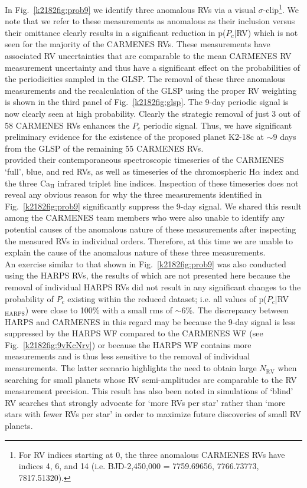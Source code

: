 In Fig.~\ref{k2182fig:prob9}
we identify three anomalous RVs via a visual $\sigma$-clip\footnote{For RV indices starting at 0, the three anomalous
  CARMENES RVs have indices 4, 6, and 14 (i.e. BJD-2,450,000 = 7759.69656, 7766.73773, 7817.51320).}.
We note that we refer to these measurements as anomalous as their inclusion
versus their omittance clearly results in a significant reduction in p($P_c|$RV) which is not seen for the majority of
the CARMENES RVs. These measurements have associated RV uncertainties that are
comparable to the mean CARMENES RV measurement uncertainty and thus have a significant effect on the probabilities
of the periodicities sampled in the GLSP. The removal of these three anomalous measurements and the
recalculation of the GLSP using the proper RV weighting is shown in the third panel of Fig.~\ref{k2182fig:glsp}.
The 9-day periodic signal is now clearly seen at high probability. Clearly the strategic removal of just
3 out of 58 CARMENES RVs enhances the $P_c$ periodic signal. Thus, we have significant preliminary evidence for the
existence of the proposed planet K2-18c at $\sim 9$ days from the GLSP of the remaining 55 CARMENES RVs. \\

 provided their contemporaneous spectroscopic timeseries of the CARMENES `full', 
blue, and red RVs, as well as timeseries of the chromospheric  H$\alpha$ index and the three Ca$_{\text{II}}$ infrared
triplet line indices. Inspection of these timeseries does not reveal any obvious reason for why the three
measurements identified in Fig.~\ref{k2182fig:prob9} significantly suppress the 9-day signal.
We shared this result among the CARMENES team
members who were also unable to identify any potential causes of the anomalous nature of these measurements
after inspecting the measured RVs in individual orders. Therefore, at this time we are unable to explain
the cause of the anomalous nature of these three measurements. \\

An exercise similar to that  shown in Fig.~\ref{k2182fig:prob9} was also conducted using the HARPS RVs,  the results of which
are not presented here because the removal of individual HARPS RVs did not result
in any significant changes to the probability of $P_c$ existing within the reduced dataset; i.e. all values of
p($P_c$|RV$_{\text{HARPS}}$) were close to 100\% with a small rms of $\sim 6$\%.
The discrepancy between HARPS and CARMENES in this regard may be because the 9-day signal
is less suppressed by the HARPS WF compared to the CARMENES WF (see Fig.~\ref{k2182fig:9vKcNrv}) or because the HARPS
WF contains more measurements and is thus less sensitive to the removal of individual measurements. The latter
scenario highlights the need to obtain large $N_{\text{RV}}$ when searching for small planets whose RV
semi-amplitudes are comparable to the RV measurement precision. This result has also been noted in simulations of
`blind' RV searches \citep[e.g.][]{cloutier18a} that strongly advocate for `more RVs per star' rather than `more stars
with fewer RVs per star' in order to maximize future discoveries of small RV planets.



